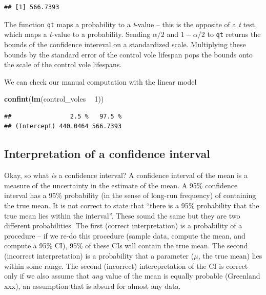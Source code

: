 \documentclass[]{book}
\newenvironment{Shaded}{\begin{snugshade}}{\end{snugshade}}
\newcommand{\DecValTok}[1]{\textcolor[rgb]{0.00,0.00,0.81}{#1}}
\newcommand{\KeywordTok}[1]{\textcolor[rgb]{0.13,0.29,0.53}{\textbf{#1}}}
\newcommand{\NormalTok}[1]{#1}
\newcommand{\OperatorTok}[1]{\textcolor[rgb]{0.81,0.36,0.00}{\textbf{#1}}}
\newcommand{\StringTok}[1]{\textcolor[rgb]{0.31,0.60,0.02}{#1}}
\begin{document}
\begin{verbatim}
## [1] 566.7393
\end{verbatim}

The function \texttt{qt} maps a probability to a \emph{t}-value -- this is the opposite of a \emph{t} test, which maps a \emph{t}-value to a probability. Sending \(\alpha/2\) and \(1 - \alpha/2\) to \texttt{qt} returns the bounds of the confidence intereval on a standardized scale. Multiplying these bounds by the standard error of the control vole lifespan pops the bounds onto the scale of the control vole lifespans.

We can check our manual computation with the linear model

\begin{Shaded}
\begin{Highlighting}[]
\KeywordTok{confint}\NormalTok{(}\KeywordTok{lm}\NormalTok{(control_voles }\OperatorTok{~}\StringTok{ }\DecValTok{1}\NormalTok{))}
\end{Highlighting}
\end{Shaded}

\begin{verbatim}
##                2.5 %   97.5 %
## (Intercept) 440.0464 566.7393
\end{verbatim}

\hypertarget{interpretation-of-a-confidence-interval}{%
\subsection{Interpretation of a confidence interval}\label{interpretation-of-a-confidence-interval}}

Okay, so what \emph{is} a confidence interval? A confidence interval of the mean is a measure of the uncertainty in the estimate of the mean. A 95\% confidence interval has a 95\% probability (in the sense of long-run frequency) of containing the true mean. It is not correct to state that ``there is a 95\% probability that the true mean lies within the interval''. These sound the same but they are two different probabilities. The first (correct interpretation) is a probability of a procedure -- if we re-do this procedure (sample data, compute the mean, and compute a 95\% CI), 95\% of these CIs will contain the true mean. The second (incorrect interpretation) is a probability that a parameter (\(\mu\), the true mean) lies within some range. The second (incorrect) interepretation of the CI is correct only if we also assume that \emph{any} value of the mean is equally probable (Greenland xxx), an assumption that is absurd for almost any data.
\end{document}
